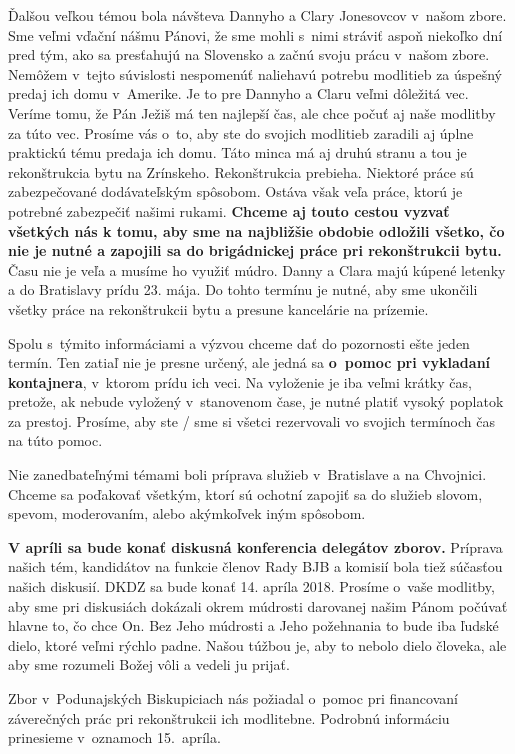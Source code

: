 Ďalšou veľkou témou bola návšteva Dannyho a Clary Jonesovcov v~našom zbore. Sme veľmi vďační nášmu Pánovi, že sme mohli s~nimi stráviť aspoň niekoľko dní pred tým, ako sa presťahujú na Slovensko a začnú svoju prácu v~našom zbore. Nemôžem v~tejto súvislosti nespomenúť naliehavú potrebu modlitieb za úspešný predaj ich domu v~Amerike. Je to pre Dannyho a Claru veľmi dôležitá vec. Veríme tomu, že Pán Ježiš má ten najlepší čas, ale chce počuť aj naše modlitby za túto vec. Prosíme vás o~to, aby ste do svojich modlitieb zaradili aj úplne praktickú tému predaja ich domu.
Táto minca má aj druhú stranu a tou je rekonštrukcia bytu na Zrínskeho. Rekonštrukcia prebieha. Niektoré práce sú zabezpečované dodávateľským spôsobom. Ostáva však veľa práce, ktorú je potrebné zabezpečiť našimi rukami. {\bf Chceme aj touto cestou vyzvať všetkých nás k tomu, aby sme na najbližšie obdobie odložili všetko, čo nie je nutné a zapojili sa do brigádnickej práce pri rekonštrukcii bytu.} Času nie je veľa a musíme ho využiť múdro.
Danny a Clara majú kúpené letenky a do Bratislavy prídu 23. mája. Do tohto termínu je nutné, aby sme ukončili všetky práce na rekonštrukcii bytu a presune kancelárie na prízemie.

Spolu s~týmito informáciami a výzvou chceme dať do pozornosti ešte jeden termín. Ten zatiaľ nie je presne určený, ale jedná sa {\bf o~pomoc pri vykladaní kontajnera}, v~ktorom prídu ich veci. Na vyloženie je iba veľmi krátky čas, pretože, ak nebude vyložený v~stanovenom čase, je nutné platiť vysoký poplatok za prestoj. Prosíme, aby ste / sme si všetci rezervovali vo svojich termínoch čas na túto pomoc.

Nie zanedbateľnými témami boli príprava služieb v~Bratislave a na Chvojnici. Chceme sa poďakovať všetkým, ktorí sú ochotní zapojiť sa do služieb slovom, spevom, moderovaním, alebo akýmkoľvek iným spôsobom.

{\bf V apríli sa bude konať diskusná konferencia delegátov zborov.} Príprava našich tém, kandidátov na funkcie členov Rady BJB a komisií bola tiež súčasťou našich diskusií. DKDZ sa bude konať 14. apríla 2018. Prosíme o~vaše modlitby, aby sme pri diskusiách dokázali okrem múdrosti darovanej našim Pánom počúvať hlavne to, čo chce On. Bez Jeho múdrosti a Jeho požehnania to bude iba ľudské dielo, ktoré veľmi rýchlo padne. Našou túžbou je, aby to nebolo dielo človeka, ale aby sme rozumeli Božej vôli a vedeli ju prijať.

Zbor v~Podunajských Biskupiciach nás požiadal o~pomoc pri financovaní záverečných prác pri rekonštrukcii ich modlitebne. Podrobnú informáciu prinesieme v~oznamoch 15.~apríla.

